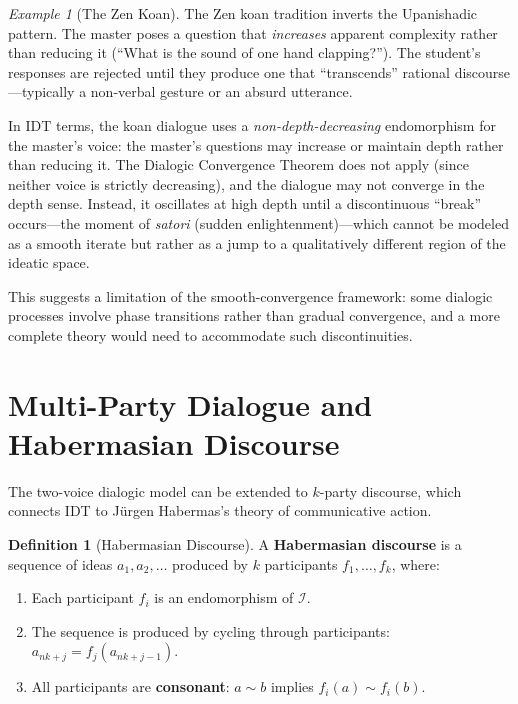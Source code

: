 \documentclass[11pt,openany]{book}
\theoremstyle{definition}
\newtheorem{definition}[axiom]{Definition}
\theoremstyle{plain}
\theoremstyle{remark}
\newtheorem{example}[axiom]{Example}
\newcommand{\IS}{\mathcal{I}}               %
\newcommand{\res}{\sim}                      %
\begin{document}
\begin{example}[The Zen Koan]
The Zen koan tradition inverts the Upanishadic pattern. The master poses a question that \emph{increases} apparent complexity rather than reducing it (``What is the sound of one hand clapping?''). The student's responses are rejected until they produce one that ``transcends'' rational discourse---typically a non-verbal gesture or an absurd utterance.

In IDT terms, the koan dialogue uses a \emph{non-depth-decreasing} endomorphism for the master's voice: the master's questions may increase or maintain depth rather than reducing it. The Dialogic Convergence Theorem does not apply (since neither voice is strictly decreasing), and the dialogue may not converge in the depth sense. Instead, it oscillates at high depth until a discontinuous ``break'' occurs---the moment of \emph{satori} (sudden enlightenment)---which cannot be modeled as a smooth iterate but rather as a jump to a qualitatively different region of the ideatic space.

This suggests a limitation of the smooth-convergence framework: some dialogic processes involve phase transitions rather than gradual convergence, and a more complete theory would need to accommodate such discontinuities.
\end{example}

\section{Multi-Party Dialogue and Habermasian Discourse}

The two-voice dialogic model can be extended to $k$-party discourse, which connects IDT to Jürgen Habermas's theory of communicative action.

\begin{definition}[Habermasian Discourse]
A \textbf{Habermasian discourse} is a sequence of ideas $a_1, a_2, \ldots$ produced by $k$ participants $f_1, \ldots, f_k$, where:
\begin{enumerate}
\item Each participant $f_i$ is an endomorphism of $\IS$.
\item The sequence is produced by cycling through participants: $a_{nk+j} = f_j(a_{nk+j-1})$.
\item All participants are \textbf{consonant}: $a \res b$ implies $f_i(a) \res f_i(b)$.
\end{enumerate}
\end{definition}
\end{document}
